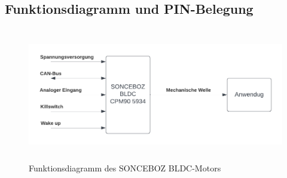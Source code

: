 \subsection{Funktionsdiagramm und PIN-Belegung}
\begin{figure}[h]
    \begin{center}
        \includegraphics[width=14.61cm, height= 5.79cm]{images/Abbildung 4.png}
        \caption{Funktionsdiagramm des SONCEBOZ BLDC-Motors \cite{SONCEBOZ}}
        \label{Fdiagramm SONCEBOZ BLDC}
        \end{center}
\end{figure}
\clearpage

